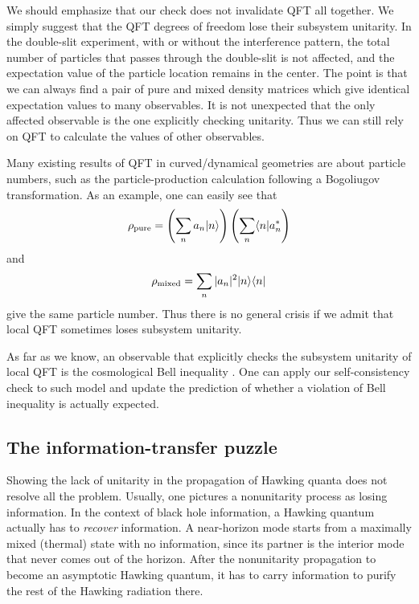 \documentclass[aps,showpacs,twocolumn,floats,prd,superscriptaddress,nofootinbib]{revtex4-1}
\begin{document}
We should emphasize that our check does not invalidate QFT all together.
We simply suggest that the QFT degrees of freedom lose their subsystem unitarity.
In the double-slit experiment, with or without the interference pattern, the total number of particles that passes through the double-slit is not affected, and the expectation value of the particle location remains in the center.
The point is that we can always find a pair of pure and mixed density matrices which give identical expectation values to many observables.
It is not unexpected that the only affected observable is the one explicitly checking unitarity.
Thus we can still rely on QFT to calculate the values of other observables.

Many existing results of QFT in curved/dynamical geometries are about particle numbers, such as the particle-production calculation following a Bogoliugov transformation. 
As an example, one can easily see that
\begin{equation}
\rho_{\rm pure} = \left(\sum_n a_n|n\rangle\right)
\left(\sum_n \langle n| a_n^*\right)
\end{equation}
and
\begin{equation}
\rho_{\rm mixed} = \sum_n |a_n|^2 |n\rangle\langle n|
\end{equation}
give the same particle number. 
Thus there is no general crisis if we admit that local QFT sometimes loses subsystem unitarity. 

As far as we know, an observable that explicitly checks the subsystem unitarity of local QFT is the cosmological Bell inequality \cite{Mal15}. 
One can apply our self-consistency check to such model and update the prediction of whether a violation of Bell inequality is actually expected.


\subsection{The information-transfer puzzle}

Showing the lack of unitarity in the propagation of Hawking quanta does not resolve all the problem. 
Usually, one pictures a nonunitarity process as losing information. 
In the context of black hole information, a Hawking quantum actually has to {\it recover} information. 
A near-horizon mode starts from a maximally mixed (thermal) state with no information, since its partner is the interior mode that never comes out of the horizon. 
After the nonunitarity propagation to become an asymptotic Hawking quantum, it has to carry information to purify the rest of the Hawking radiation there.
\end{document}
